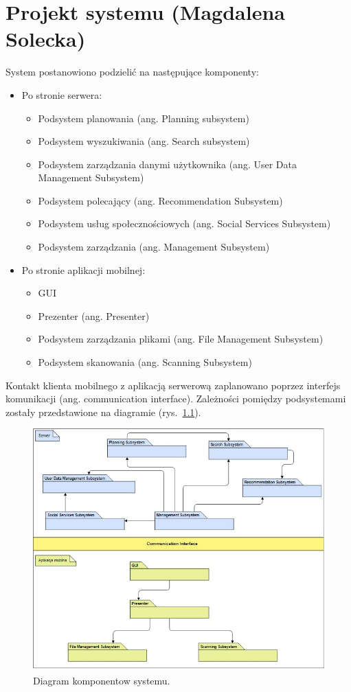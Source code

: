 \documentclass[10pt,twoside,a4paper]{report}
\begin{document}
\chapter{Projekt systemu (Magdalena Solecka)}
\par System postanowiono podzielić na następujące komponenty:
\begin{itemize}
\item Po stronie serwera:
\begin{itemize}
\item Podsystem planowania (ang. Planning subsystem)
\item Podsystem wyszukiwania (ang. Search subsystem)
\item Podsystem zarządzania danymi użytkownika (ang. User Data Management Subsystem)
\item Podsystem polecający (ang. Recommendation Subsystem)
\item Podsystem usług społecznościowych (ang. Social Services Subsystem)
\item Podsystem zarządzania (ang. Management Subsystem)
\end{itemize}
\item Po stronie aplikacji mobilnej:
\begin{itemize}
\item GUI
\item Prezenter (ang. Presenter)
\item Podsystem zarządzania plikami (ang. File Management Subsystem)
\item Podsystem skanowania (ang. Scanning Subsystem)
\end{itemize}
\end{itemize}
\par Kontakt klienta mobilnego z aplikacją serwerową zaplanowano poprzez interfejs komunikacji (ang. communication interface). Zależności pomiędzy podsystemami zostały przedstawione na diagramie (rys.~\ref{fig:subsystems}).

\indent\newline
\begin{figure}[h]
\centering
\includegraphics[width=\linewidth]{subsystems}
\caption{Diagram komponentow systemu.}
\label{fig:subsystems}
\end{figure}
\end{document}
